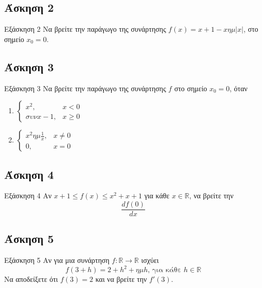 \documentclass[greek]{beamer}
\begin{document}
\subsection{Άσκηση 2}
\begin{frame}[label=Άσκηση2]{Εξάσκηση 2}
 Να βρείτε την παράγωγο της συνάρτησης $f(x)=x+1-xημ|x|$, στο σημείο $x_0=0$.

\end{frame}

\subsection{Άσκηση 3}
\begin{frame}[label=Άσκηση3]{Εξάσκηση 3}
 Να βρείτε την παράγωγο της συνάρτησης $f$ στο σημείο $x_0=0$, όταν
 \begin{enumerate}
  \item<1-> $\begin{cases}
     x^2,    & x<0    \\
     συνx-1, & x\ge 0
    \end{cases}$
  \item<2-> $\begin{cases}
     x^2ημ\frac{1}{x}, & x\ne 0 \\
     0,                & x= 0
    \end{cases}$
 \end{enumerate}

\end{frame}

\subsection{Άσκηση 4}
\begin{frame}[label=Άσκηση4]{Εξάσκηση 4}
 Αν $x+1\le f(x) \le x^2+x+1$ για κάθε $x\in\mathbb{R}$, να βρείτε την
 $$\frac{df(0)}{dx}$$

\end{frame}

\subsection{Άσκηση 5}
\begin{frame}[label=Άσκηση5]{Εξάσκηση 5}
 Αν για μια συνάρτηση $f:\mathbb{R}\to\mathbb{R}$ ισχύει
 $$f(3+h)=2+h^2+ημh \text{, για κάθε } h\in\mathbb{R}$$
 Να αποδείξετε ότι $f(3)=2$ και να βρείτε την $f'(3)$.

\end{frame}
\end{document}
